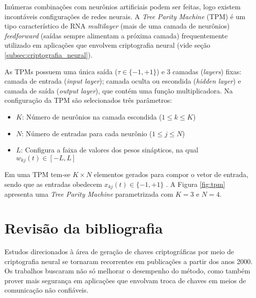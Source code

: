 \documentclass[12pt]{article}
\begin{document}
            
            Inúmeras combinações com neurônios artificiais podem ser feitas, logo existem incontáveis configurações de redes neurais. A \textit{Tree Parity Machine} (TPM) é um tipo característico de RNA \textit{multilayer} (mais de uma camada de neurônios) \textit{feedforward} (saídas sempre alimentam a próxima camada) frequentemente utilizado em aplicações que envolvem criptografia neural (vide seção \ref{subsec:criptografia_neural}).
            
            As TPMs possuem uma única saída ($\tau \in \{-1,+1\}$) e 3 camadas (\textit{layers}) fixas: camada de entrada (\textit{input layer}); camada oculta ou escondida  (\textit{hidden layer}) e camada de saída (\textit{output layer}), que contém uma função multiplicadora. Na configuração da TPM são selecionados três parâmetros: 
            \begin{itemize}
                \item $K$: Número de neurônios na camada escondida ($1 \leq k \leq K$)
                \item $N$: Número de entradas para cada neurônio ($1 \leq j \leq N$)
                \item $L$: Configura a faixa de valores dos pesos sinápticos, na qual $w_{kj}(t) \in [-L,L]$
            \end{itemize}
            Em uma TPM tem-se $K \times N$ elementos gerados para compor o vetor de entrada, sendo que as entradas obedecem $x_{kj}(t) \in \{-1,+1\}$ \cite{volkmer2005tree}. A Figura \ref{fig:tpm} apresenta uma \textit{Tree Parity Machine} parametrizada com $K = 3$ e $N = 4$.
            
            
  
    \section{Revisão da bibliografia}
    \label{sec:revisao_da_bibliografia}
  
        Estudos direcionados à área de geração de chaves criptográficas por meio de criptografia neural se tornaram recorrentes em publicações a partir dos anos 2000. Os trabalhos buscaram não só melhorar o desempenho do método, como também prover mais segurança em aplicações que envolvam troca de chaves em meios de comunicação não confiáveis.
    
\end{document}
